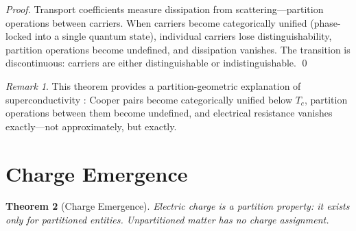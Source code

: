 \documentclass[twocolumn,10pt,a4paper]{article}
\newtheorem{theorem}{Theorem}[section]
\theoremstyle{definition}
\theoremstyle{remark}
\newtheorem{remark}[theorem]{Remark}
\begin{document}
\begin{proof}
Transport coefficients measure dissipation from scattering---partition operations between carriers. When carriers become categorically unified (phase-locked into a single quantum state), individual carriers lose distinguishability, partition operations become undefined, and dissipation vanishes. The transition is discontinuous: carriers are either distinguishable or indistinguishable. \qed
\end{proof}

\begin{remark}
This theorem provides a partition-geometric explanation of superconductivity \citep{onnes1911,bcs1957}: Cooper pairs become categorically unified below $T_c$, partition operations between them become undefined, and electrical resistance vanishes exactly---not approximately, but exactly.
\end{remark}

\section{Charge Emergence}
\label{sec:charge}

\begin{theorem}[Charge Emergence]
\label{thm:charge}
Electric charge is a partition property: it exists only for partitioned entities. Unpartitioned matter has no charge assignment.
\end{theorem}
\end{document}
